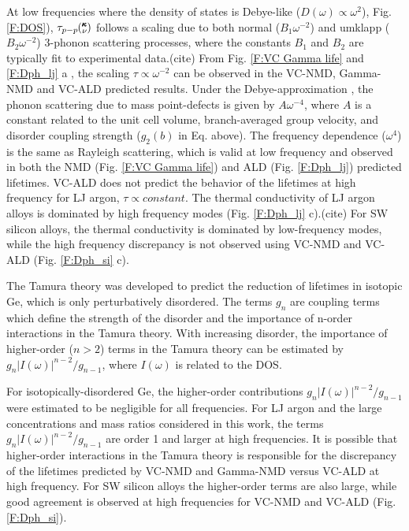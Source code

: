 \documentclass[aps,prb,twocolumn,superscriptaddress,amsmath,amssymb,floatfix]{revtex4}
\newcommand{\kv}{\mspace{-4.0mu}\left(\mspace{-8.0mu}
\begin{smallmatrix}&\pmb{\kappa} \\&\nu\end{smallmatrix}
\mspace{-3.0mu}\right)}
\begin{document}
At low frequencies where the density of states is Debye-like 
($D(\omega) \propto \omega^{2}$), Fig. \ref{F:DOS}), 
$\tau_{p-p}\kv$ follows a scaling due to both normal ($B_1\omega^{-2}$) 
and umklapp ($B_2\omega^{-2}$) 3-phonon scattering processes, where the 
constants $B_1$ and $B_2$ are typically fit to experimental data.(cite) 
From Fig. \ref{F:VC Gamma life} and \ref{F:Dph_lj} a , 
the scaling $\tau \propto \omega^{-2}$ can be 
observed  
in the VC-NMD, Gamma-NMD and VC-ALD predicted results. 
Under the Debye-approximation , 
the phonon scattering due to mass point-defects 
is given by $A\omega^{-4}$, where $A$ is a constant related to the unit 
cell volume, branch-averaged group velocity, and disorder coupling strength 
($g_2(b)$ in Eq. above). 
The frequency dependence ($\omega^4$) is the same as 
Rayleigh scattering, which is valid at low frequency and observed 
in both the NMD (Fig. \ref{F:VC Gamma life}) and ALD 
(Fig. \ref{F:Dph_lj}) predicted lifetimes. 
VC-ALD does not predict the behavior of the lifetimes at high frequency 
for LJ argon, $\tau \propto constant$. The thermal conductivity of 
LJ argon alloys is dominated by high frequency modes 
(Fig. \ref{F:Dph_lj} c).(cite)  
For SW silicon alloys, the thermal conductivity is dominated by 
low-frequency modes, while the high frequency discrepancy is 
not observed using VC-NMD and VC-ALD (Fig. \ref{F:Dph_si} c). 

The Tamura theory was developed to predict the reduction of lifetimes 
in isotopic Ge, which is only perturbatively disordered. 
The terms $g_n$ are  
coupling terms which define the strength of the disorder and the 
importance of n-order interactions in the Tamura theory.  
With increasing disorder, 
the importance of higher-order ($n > 2$) terms in the 
Tamura theory can be estimated by $g_n|I(\omega)|^{n-2}/g_{n-1}$, 
where $I(\omega)$ is related to the DOS.\cite{tamura_isotope_1983} 

For isotopically-disordered Ge, the higher-order contributions 
$g_n|I(\omega)|^{n-2}/g_{n-1}$ were estimated to be negligible for all 
frequencies.\cite{tamura_isotope_1983} 
For LJ argon and the large concentrations and mass ratios considered 
in this work, the terms 
$g_n|I(\omega)|^{n-2}/g_{n-1}$ are order 1 and larger at high 
frequencies. It is possible that 
higher-order interactions in the Tamura theory 
is responsible for the 
discrepancy of the lifetimes predicted by VC-NMD and Gamma-NMD 
versus VC-ALD at high frequency.
For SW silicon alloys the higher-order terms are also large, while 
good agreement is observed at high frequencies for VC-NMD and VC-ALD 
(Fig. \ref{F:Dph_si}).
\end{document}
